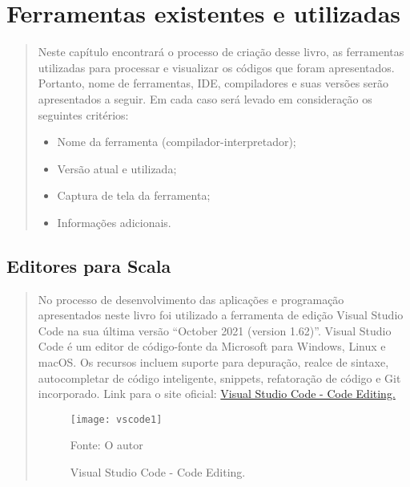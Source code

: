 


\chapter{Ferramentas existentes e utilizadas}

\begin{quote}

  Neste capítulo encontrará o processo de criação desse livro, as ferramentas utilizadas para processar e visualizar os códigos que foram apresentados. Portanto, nome de ferramentas, IDE, compiladores e suas versões serão apresentados a seguir.
  \hspace{2.5mm} Em cada caso será levado em consideração os seguintes critérios:
  \begin{itemize}
    \item Nome da ferramenta (compilador-interpretador);
    \item Vers\~{a}o atual e utilizada;
    \item Captura de tela da ferramenta;
    \item Informa\c{c}\~{o}es adicionais.
  \end{itemize}
\end{quote}


\section{Editores para Scala}
\begin{quote}
  No processo de desenvolvimento das aplicações e programação apresentados neste livro foi utilizado a ferramenta de edição Visual Studio Code na sua última versão “October 2021 (version 1.62)”.
  Visual Studio Code é um editor de código-fonte da Microsoft para Windows, Linux e macOS. Os recursos incluem suporte para depuração, realce de sintaxe, autocompletar de código inteligente, snippets, refatoração de código e Git incorporado.
  Link para o site oficial: \href{https://code.visualstudio.com/}{Visual Studio Code - Code Editing.}
  \begin{figure}[H]
    \begin{center}
      \texttt{[image: vscode1]}
      \caption{Visual Studio Code - Code Editing.} \label{edit}
      {\tiny \sf Fonte: O autor }
    \end{center}
  \end{figure}
\end{quote}
